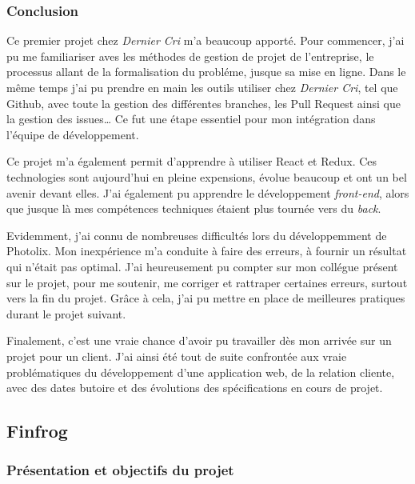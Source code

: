 \bigskip

\subsubsection{Conclusion}\label{conclusion}

\bigskip

Ce premier projet chez \emph{Dernier Cri} m'a beaucoup apporté. Pour
commencer, j'ai pu me familiariser aves les méthodes de gestion de
projet de l'entreprise, le processus allant de la formalisation du
probléme, jusque sa mise en ligne. Dans le même temps j'ai pu prendre en
main les outils utiliser chez \emph{Dernier Cri}, tel que Github, avec
toute la gestion des différentes branches, les Pull Request ainsi que la
gestion des issues\ldots{} Ce fut une étape essentiel pour mon
intégration dans l'équipe de développement.

\bigskip

Ce projet m'a également permit d'apprendre à utiliser React et Redux.
Ces technologies sont aujourd'hui en pleine expensions, évolue beaucoup
et ont un bel avenir devant elles. J'ai également pu apprendre le
développement \emph{front-end}, alors que jusque là mes compétences
techniques étaient plus tournée vers du \emph{back}.

\bigskip

Evidemment, j'ai connu de nombreuses difficultés lors du développemment
de Photolix. Mon inexpérience m'a conduite à faire des erreurs, à
fournir un résultat qui n'était pas optimal. J'ai heureusement pu
compter sur mon collégue présent sur le projet, pour me soutenir, me
corriger et rattraper certaines erreurs, surtout vers la fin du projet.
Grâce à cela, j'ai pu mettre en place de meilleures pratiques durant le
projet suivant.

\bigskip

Finalement, c'est une vraie chance d'avoir pu travailler dès mon arrivée
sur un projet pour un client. J'ai ainsi été tout de suite confrontée
aux vraie problématiques du développement d'une application web, de la
relation cliente, avec des dates butoire et des évolutions des
spécifications en cours de projet.

\subsection{Finfrog}\label{finfrog}

\subsubsection{Présentation et objectifs du
projet}\label{pruxe9sentation-et-objectifs-du-projet-1}

